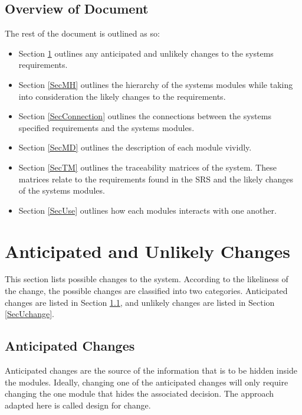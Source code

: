 \documentclass[12pt, titlepage]{article}
\begin{document}
\subsection{Overview of Document}
The rest of the document is outlined as so:
\begin{itemize}
    \item Section \ref{SecChange} outlines any anticipated and unlikely changes to the systems requirements.
    \item Section \ref{SecMH} outlines the hierarchy of the systems modules while taking into consideration the likely changes to the requirements. 
    \item Section \ref{SecConnection} outlines the connections between the systems specified requirements and the systems modules.
    \item Section \ref{SecMD} outlines the description of each module vividly.
    \item Section \ref{SecTM} outlines the traceability matrices of the system. These matrices relate to the requirements found in the SRS and the likely changes of the systems modules.
    \item Section \ref{SecUse} outlines how each modules interacts with one another.
\end{itemize}
\section{Anticipated and Unlikely Changes} \label{SecChange}

This section lists possible changes to the system. According to the likeliness
of the change, the possible changes are classified into two
categories. Anticipated changes are listed in Section \ref{SecAchange}, and
unlikely changes are listed in Section \ref{SecUchange}.

\subsection{Anticipated Changes} \label{SecAchange}

Anticipated changes are the source of the information that is to be hidden
inside the modules. Ideally, changing one of the anticipated changes will only
require changing the one module that hides the associated decision. The approach
adapted here is called design for
change.
\end{document}
